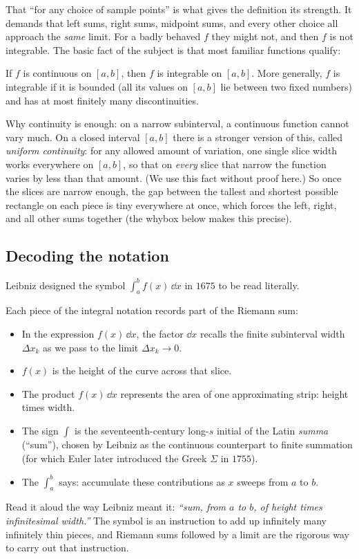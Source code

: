 That ``for any choice of sample points'' is what gives the definition its
strength. It demands that left sums, right sums, midpoint sums, and every
other choice all approach the \emph{same} limit. For a badly
behaved $f$ they might not, and then $f$ is not integrable. The basic fact
of the subject is that most familiar functions qualify:

\begin{theorem}
\label{ch20:thm-cont-integrable}
If $f$ is continuous on $[a,b]$, then $f$ is integrable on $[a,b]$. More
generally, $f$ is integrable if it is bounded (all its values on $[a,b]$ lie
between two fixed numbers) and has at most finitely many discontinuities.
\end{theorem}

Why continuity is enough: on a narrow subinterval, a continuous
function cannot vary much. On a closed interval $[a,b]$ there is a stronger
version of this, called \emph{uniform continuity}: for any allowed amount of
variation, one single slice width works everywhere on $[a,b]$, so that on
\emph{every} slice that narrow the function varies by less than that amount.
(We use this fact without proof here.) So once the slices are narrow enough, the gap
between the tallest and shortest possible rectangle on each piece is tiny
everywhere at once, which forces the left, right, and all other sums together
(the whybox below makes this precise).

\subsection{Decoding the notation}

Leibniz designed the symbol $\int_a^b f(x)\,\dd x$ in $1675$ to be read
literally.

\begin{happeningbox}
Each piece of the integral notation records part of the Riemann sum:
\begin{itemize}
\item In the expression $f(x)\,\dd x$, the factor $\dd x$ recalls the finite subinterval width $\Delta x_k$ as we pass to the limit $\Delta x_k \to 0$.
\item $f(x)$ is the height of the curve across that slice.
\item The product $f(x)\,\dd x$ represents the area of one approximating strip: height times width.
\item The sign $\int$ is the seventeenth-century long-$s$ initial of the Latin \emph{summa} (``sum''), chosen by Leibniz as the continuous counterpart to finite summation (for which Euler later introduced the Greek $\Sigma$ in $1755$).
\item The $\int_a^b$ says: accumulate these contributions as $x$ sweeps from $a$ to $b$.
\end{itemize}
Read it aloud the way Leibniz meant it: \emph{``sum, from $a$ to $b$, of height
times infinitesimal width.''} The symbol is an instruction to add up infinitely
many infinitely thin pieces, and Riemann sums followed by a limit are the
rigorous way to carry out that instruction.
\end{happeningbox}

